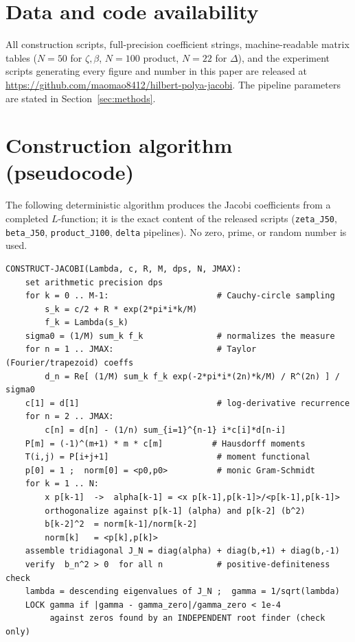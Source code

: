 \documentclass[aps,prx,reprint,floatfix]{revtex4-2}
\begin{document}
\section*{Data and code availability}
All construction scripts, full-precision coefficient strings, machine-readable
matrix tables ($N=50$ for $\zeta,\beta$, $N=100$ product, $N=22$ for
$\Delta$), and the experiment scripts generating every figure and number in
this paper are released at
\url{https://github.com/maomao8412/hilbert-polya-jacobi}. The pipeline
parameters are stated in Section~\ref{sec:methods}.

\appendix

\section{Construction algorithm (pseudocode)}
\label{app:algo}
The following deterministic algorithm produces the Jacobi coefficients from a
completed $L$-function; it is the exact content of the released scripts
(\texttt{zeta\_J50}, \texttt{beta\_J50}, \texttt{product\_J100},
\texttt{delta} pipelines). No zero, prime, or random number is used.

{\small
\begin{verbatim}
CONSTRUCT-JACOBI(Lambda, c, R, M, dps, N, JMAX):
    set arithmetic precision dps
    for k = 0 .. M-1:                      # Cauchy-circle sampling
        s_k = c/2 + R * exp(2*pi*i*k/M)
        f_k = Lambda(s_k)
    sigma0 = (1/M) sum_k f_k               # normalizes the measure
    for n = 1 .. JMAX:                     # Taylor (Fourier/trapezoid) coeffs
        d_n = Re[ (1/M) sum_k f_k exp(-2*pi*i*(2n)*k/M) / R^(2n) ] / sigma0
    c[1] = d[1]                            # log-derivative recurrence
    for n = 2 .. JMAX:
        c[n] = d[n] - (1/n) sum_{i=1}^{n-1} i*c[i]*d[n-i]
    P[m] = (-1)^(m+1) * m * c[m]          # Hausdorff moments
    T(i,j) = P[i+j+1]                      # moment functional
    p[0] = 1 ;  norm[0] = <p0,p0>          # monic Gram-Schmidt
    for k = 1 .. N:
        x p[k-1]  ->  alpha[k-1] = <x p[k-1],p[k-1]>/<p[k-1],p[k-1]>
        orthogonalize against p[k-1] (alpha) and p[k-2] (b^2)
        b[k-2]^2  = norm[k-1]/norm[k-2]
        norm[k]   = <p[k],p[k]>
    assemble tridiagonal J_N = diag(alpha) + diag(b,+1) + diag(b,-1)
    verify  b_n^2 > 0  for all n           # positive-definiteness check
    lambda = descending eigenvalues of J_N ;  gamma = 1/sqrt(lambda)
    LOCK gamma if |gamma - gamma_zero|/gamma_zero < 1e-4
         against zeros found by an INDEPENDENT root finder (check only)
\end{verbatim}
}
\end{document}
